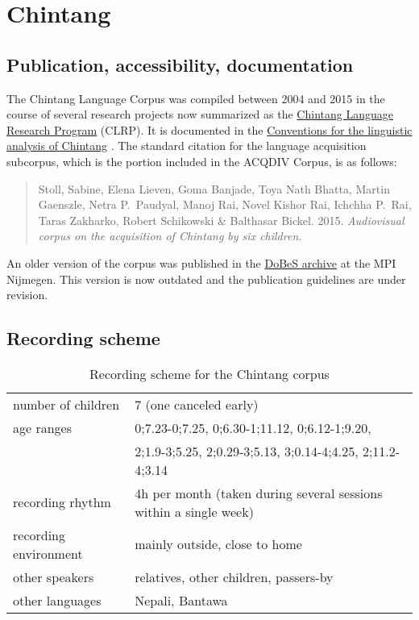 \documentclass[a4paper, 11pt]{book}
\begin{document}
\section{Chintang}
\label{sec:Chintang}

\subsection{Publication, accessibility, documentation}
The Chintang Language Corpus \citep{Stoll_etal2015b} was compiled between 2004 and 2015 in the course of several research projects now summarized as the \href{http://www.clrp.uzh.ch}{Chintang Language Research Program} (CLRP). It is documented in the \href{http://spwarran.uzh.ch/chintangwiki/index.php/Conventions_for_the_linguistic_analysis_of_Chintang}{Conventions for the linguistic analysis of Chintang} \citep{Schikowski2015a}. The standard citation for the language acquisition subcorpus, which is the portion included in the ACQDIV Corpus, is as follows: 

\begin{quote}
	Stoll, Sabine, Elena Lieven, Goma Banjade, Toya Nath Bhatta, Martin Gaenszle, Netra P.\ Paudyal, Manoj Rai, Novel Kishor Rai, 
	Ichchha P.\ Rai, Taras Zakharko, Robert Schikowski \& Balthasar Bickel. 2015. \emph{Audiovisual corpus on the acquisition of Chintang by six children.} %
\end{quote}

An older version of the corpus was published in the \href{http://dobes.mpi.nl/}{DoBeS archive} at the MPI Nijmegen. This version is now outdated and the publication guidelines are under revision. 


\subsection{Recording scheme}

\begin{table}[ht]
	\centering
	\begin{tabular}{ll}
		\toprule
		number of children 	& 7 (one canceled early) \\
		age ranges 			& 0;7.23-0;7.25, 0;6.30-1;11.12, 0;6.12-1;9.20, \\
							& 2;1.9-3;5.25, 2;0.29-3;5.13, 3;0.14-4;4.25, 2;11.2-4;3.14 \\
		recording rhythm 	& 4h per month (taken during several sessions within a single week) \\
		recording environment & mainly outside, close to home \\
		other speakers		& relatives, other children, passers-by \\
		other languages		& Nepali, Bantawa \\
		\bottomrule		
	\end{tabular}
	\caption{Recording scheme for the Chintang corpus}
	\label{tab:Chintang recording scheme}
\end{table}
\end{document}
